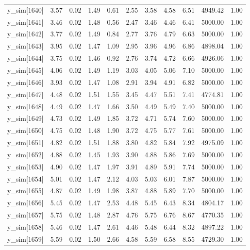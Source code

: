 \begin{table}[ht]
\begin{tabular}{rrrrrrrrrrr}
  y\_sim[1640] & 3.57 & 0.02 & 1.49 & 0.61 & 2.55 & 3.58 & 4.58 & 6.51 & 4949.42 & 1.00 \\ 
  y\_sim[1641] & 3.46 & 0.02 & 1.48 & 0.56 & 2.47 & 3.46 & 4.46 & 6.41 & 5000.00 & 1.00 \\ 
  y\_sim[1642] & 3.77 & 0.02 & 1.49 & 0.84 & 2.77 & 3.76 & 4.79 & 6.63 & 5000.00 & 1.00 \\ 
  y\_sim[1643] & 3.95 & 0.02 & 1.47 & 1.09 & 2.95 & 3.96 & 4.96 & 6.86 & 4898.04 & 1.00 \\ 
  y\_sim[1644] & 3.75 & 0.02 & 1.46 & 0.92 & 2.76 & 3.74 & 4.72 & 6.66 & 4926.06 & 1.00 \\ 
  y\_sim[1645] & 4.06 & 0.02 & 1.49 & 1.19 & 3.03 & 4.05 & 5.06 & 7.10 & 5000.00 & 1.00 \\ 
  y\_sim[1646] & 3.93 & 0.02 & 1.47 & 1.08 & 2.91 & 3.94 & 4.91 & 6.82 & 5000.00 & 1.00 \\ 
  y\_sim[1647] & 4.48 & 0.02 & 1.51 & 1.55 & 3.45 & 4.47 & 5.51 & 7.41 & 4774.81 & 1.00 \\ 
  y\_sim[1648] & 4.49 & 0.02 & 1.47 & 1.66 & 3.50 & 4.49 & 5.49 & 7.40 & 5000.00 & 1.00 \\ 
  y\_sim[1649] & 4.73 & 0.02 & 1.49 & 1.85 & 3.72 & 4.71 & 5.74 & 7.60 & 5000.00 & 1.00 \\ 
  y\_sim[1650] & 4.75 & 0.02 & 1.48 & 1.90 & 3.72 & 4.75 & 5.77 & 7.61 & 5000.00 & 1.00 \\ 
  y\_sim[1651] & 4.82 & 0.02 & 1.51 & 1.88 & 3.80 & 4.82 & 5.84 & 7.92 & 4975.09 & 1.00 \\ 
  y\_sim[1652] & 4.88 & 0.02 & 1.45 & 1.93 & 3.90 & 4.88 & 5.86 & 7.69 & 5000.00 & 1.00 \\ 
  y\_sim[1653] & 4.90 & 0.02 & 1.47 & 1.97 & 3.91 & 4.89 & 5.91 & 7.74 & 5000.00 & 1.00 \\ 
  y\_sim[1654] & 5.01 & 0.02 & 1.47 & 2.12 & 4.03 & 5.03 & 6.01 & 7.87 & 5000.00 & 1.00 \\ 
  y\_sim[1655] & 4.87 & 0.02 & 1.49 & 1.98 & 3.87 & 4.88 & 5.89 & 7.70 & 5000.00 & 1.00 \\ 
  y\_sim[1656] & 5.45 & 0.02 & 1.47 & 2.53 & 4.48 & 5.45 & 6.43 & 8.34 & 4804.17 & 1.00 \\ 
  y\_sim[1657] & 5.75 & 0.02 & 1.48 & 2.87 & 4.76 & 5.75 & 6.76 & 8.67 & 4770.35 & 1.00 \\ 
  y\_sim[1658] & 5.46 & 0.02 & 1.47 & 2.61 & 4.46 & 5.48 & 6.44 & 8.32 & 4897.22 & 1.00 \\ 
  y\_sim[1659] & 5.59 & 0.02 & 1.50 & 2.66 & 4.58 & 5.59 & 6.58 & 8.55 & 4729.30 & 1.00 \\ 

\end{tabular}
\end{table}
